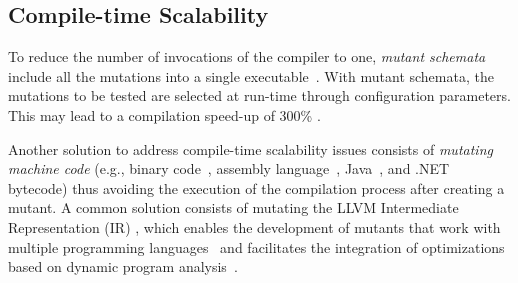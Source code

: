%

\subsection{Compile-time Scalability}
\label{sec:compile:time}


To reduce the number of invocations of the compiler to one, \emph{mutant schemata} include all the mutations into a single executable~\cite{untch1993mutation}. 
With mutant schemata, the mutations to be tested are selected at run-time through configuration parameters. This may lead to a compilation speed-up of 300\% \cite{papadakis2010automatic}. 


Another solution to address compile-time scalability issues consists of \emph{mutating machine code}  (e.g., binary code~\cite{becker2012xemu}, assembly language~\cite{crouzet2006sesame},
Java~\cite{ma2006mujava}, 
 and
.NET~\cite{derezinska2011object} bytecode) thus avoiding the execution of the compilation process after creating a mutant. 
A common solution consists of mutating the
 LLVM Intermediate Representation (IR) \cite{hariri2016evaluating}, 
which enables the development of mutants that work with multiple programming languages~\cite{hariri2019comparing} and facilitates the integration of optimizations based on dynamic program analysis~\cite{denisov2018mull}.


